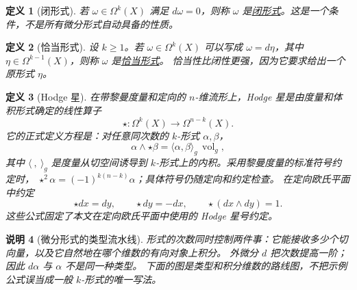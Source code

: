 \documentclass[UTF8,fontset=none,a4paper,11pt]{ctexart}
\theoremstyle{foundation-definition}
\newtheorem{definition}{定义}[section]
\theoremstyle{foundation-theorem}
\theoremstyle{foundation-proposition}
\theoremstyle{foundation-example}
\theoremstyle{foundation-remark}
\newtheorem{remark}[definition]{说明}
\theoremstyle{foundation-theorem}
\newcommand{\term}[2]{\hyperref[#1]{#2}}
\begin{document}
\begin{definition}[闭形式]\label{def:closed-form}
若 \(\omega\in\Omega^k(X)\) 满足 \(d\omega=0\)，则称 \(\omega\) 是\term{def:closed-form}{闭形式}。这是一个条件，不是所有微分形式自动具备的性质。
\end{definition}

\begin{definition}[恰当形式]\label{def:exact-form}
设 \(k\geq1\)。若 \(\omega\in\Omega^k(X)\) 可以写成 \(\omega=d\eta\)，其中
\(\eta\in\Omega^{k-1}(X)\)，则称 \(\omega\) 是\term{def:exact-form}{恰当形式}。
恰当性比闭性更强，因为它要求给出一个原形式 \(\eta\)。
\end{definition}

\begin{definition}[Hodge 星]\label{def:hodge-star}
在带黎曼度量和定向的 \(n\)-维流形上，Hodge 星是由度量和体积形式确定的线性算子
\[
\star:\Omega^k(X)\longrightarrow\Omega^{n-k}(X).
\]
它的正式定义方程是：对任意同次数的 \(k\)-形式 \(\alpha,\beta\)，
\[
\alpha\wedge\star\beta=\langle\alpha,\beta\rangle_g\,\operatorname{vol}_g,
\]
其中 \(\langle\ ,\ \rangle_g\) 是度量从切空间诱导到 \(k\)-形式上的内积。采用黎曼度量的标准符号约定时，
\(\star^2\alpha=(-1)^{k(n-k)}\alpha\)；具体符号仍随定向和约定检查。
在定向欧氏平面中约定
\[
\star dx=dy,\qquad \star dy=-dx,
\qquad \star(dx\wedge dy)=1.
\]
这些公式固定了本文在定向欧氏平面中使用的 Hodge 星号约定。
\end{definition}

\begin{remark}[微分形式的类型流水线]\label{rem:form-degree-pipeline}
形式的次数同时控制两件事：它能接收多少个切向量，以及它自然地在哪个维数的有向对象上积分。
外微分 \(d\) 把次数提高一阶；因此 \(d\alpha\) 与 \(\alpha\) 不是同一种类型。
下面的图是类型和积分维数的路线图，不把示例公式误当成一般 \(k\)-形式的唯一写法。
\end{remark}
\end{document}
